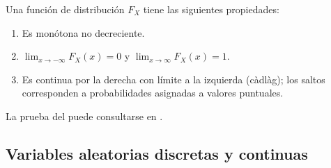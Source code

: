 \documentclass[../Main.tex]{subfiles}
\begin{document}
\begin{lemma}
\label{lemma:dist}
Una función de distribución \(F_X\) tiene las siguientes propiedades:
\begin{enumerate}
    \item Es monótona no decreciente.
    \item \(\displaystyle \lim_{x\to-\infty}F_X(x)=0\) y
          \(\displaystyle \lim_{x\to\infty}F_X(x)=1\).
    \item Es continua por la derecha con límite a la izquierda (càdlàg); los saltos corresponden a
          probabilidades asignadas a valores puntuales.
\end{enumerate}

\end{lemma}
La prueba del  puede consultarse en \cite{grimmett2001probability}.

\subsection*{Variables aleatorias discretas y continuas}
\end{document}
